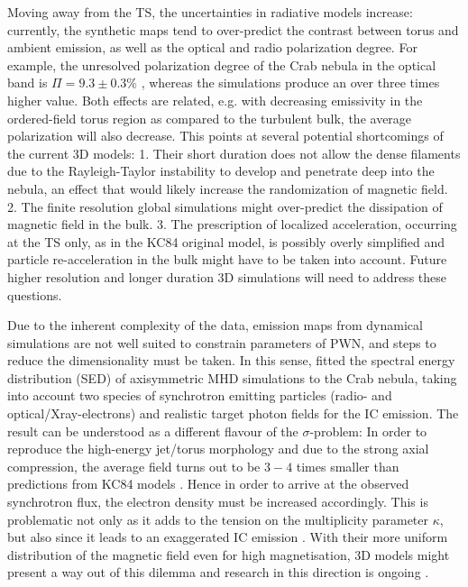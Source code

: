 Moving away from the TS, the uncertainties in radiative models increase:  currently, the synthetic maps tend to over-predict the contrast between torus and ambient emission, as well as the optical and radio polarization degree.  For example, the unresolved polarization degree of the Crab nebula in the optical band is $\Pi=9.3\pm0.3\%$ \citep{OortWalraven1956}, whereas the simulations produce an over three times higher value.
Both effects are related, e.g. with decreasing emissivity in the ordered-field torus region as compared to the turbulent bulk, the average polarization will also decrease.  
This points at several potential shortcomings of the current 3D models:  
1. Their short duration does not allow the dense filaments due to the Rayleigh-Taylor instability to develop and penetrate deep into the nebula, an effect that would likely increase the randomization of magnetic field.  
2. The finite resolution global simulations might over-predict the dissipation of magnetic field in the bulk.
3. The prescription of  localized acceleration, occurring at the TS only, as in the KC84 original model, is possibly overly simplified and particle re-acceleration in the bulk might have to be taken into account.
Future higher resolution and longer duration 3D simulations will need to address these questions.  

Due to the inherent complexity of the data, emission maps from dynamical simulations are not well suited to constrain parameters of PWN, and steps to reduce the dimensionality must be taken.  In this sense, \cite{volpi2008} fitted the spectral energy distribution (SED) of axisymmetric MHD simulations to the Crab nebula, taking into account two species of synchrotron emitting particles (radio- and optical/Xray-electrons) and realistic target photon fields for the IC emission.  
The result can be understood as a different flavour of the $\sigma$-problem:  
In order to reproduce the high-energy jet/torus morphology and due to the strong axial compression, the average field turns out to be $3-4$ times smaller than predictions from KC84 models \citep{de-JagerHarding1992}.  Hence in order to arrive at the observed synchrotron flux, the electron density must be increased accordingly. This is problematic not only as it adds to the tension on the multiplicity parameter $\kappa$, but also since it leads to an exaggerated IC emission \cite[see also the discussion in][]{AMATO_2014}.  
With their more uniform distribution of the magnetic field even for high magnetisation, 3D models might present a way out of this dilemma and research in this direction is ongoing \citep{Olmi2016}.  


